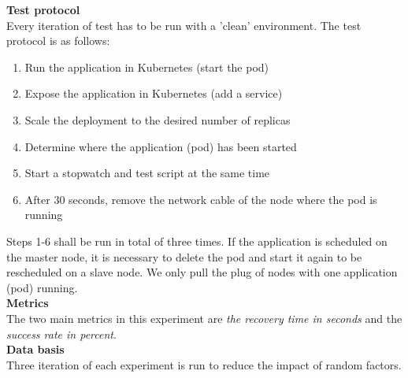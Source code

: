 \noindent\textbf{Test protocol}\\
Every iteration of test has to be run with a 'clean' environment. The test protocol is as follows:
\begin{enumerate}
  \item Run the application in Kubernetes (start the pod)
  \item Expose the application in Kubernetes (add a service)
  \item Scale the deployment to the desired number of replicas
  \item Determine where the application (pod) has been started
  \item Start a stopwatch and test script at the same time
  \item After 30 seconds, remove the network cable of the node where the pod is running
\end{enumerate}
\noindent Steps 1-6 shall be run in total of three times. If the application is scheduled on the master node, it is necessary to delete the pod and start it again to be rescheduled on a slave node. We only pull the plug of nodes with one application (pod) running.\\

\noindent\textbf{Metrics}\\
The two main metrics in this experiment are \textit{the recovery time in seconds} and the \textit{success rate in percent}.\\

\noindent\textbf{Data basis}\\
Three iteration of each experiment is run to reduce the impact of random factors.
